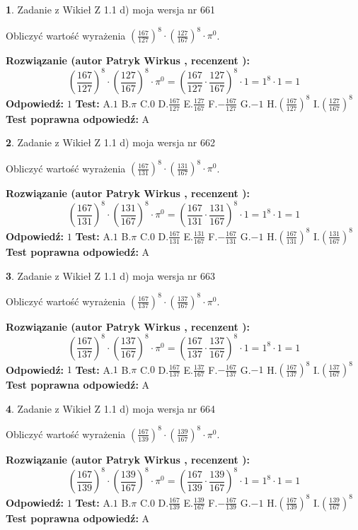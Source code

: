 \documentclass[12pt, a4paper]{article}
\theoremstyle{definition} %
\newtheorem{zad}{}
\newcommand{\zadStart}[1]{\begin{zad}#1\newline}
\newcommand{\zadStop}{\end{zad}}
\newcommand{\rozwStart}[2]{\noindent \textbf{Rozwiązanie (autor #1 , recenzent #2): }\newline}
\newcommand{\rozwStop}{\newline}
\newcommand{\odpStart}{\noindent \textbf{Odpowiedź:}\newline}
\newcommand{\odpStop}{\newline}
\newcommand{\testStart}{\noindent \textbf{Test:}\newline}
\newcommand{\testStop}{\newline}
\newcommand{\kluczStart}{\noindent \textbf{Test poprawna odpowiedź:}\newline}
\newcommand{\kluczStop}{\newline}
\begin{document}
\zadStart{Zadanie z Wikieł Z 1.1 d) moja wersja nr 661}

Obliczyć wartość wyrażenia $(\frac{167}{127})^{8} \cdot (\frac{127}{167})^{8} \cdot \pi^{0}$.
\zadStop
\rozwStart{Patryk Wirkus}{}
$$(\frac{167}{127})^{8} \cdot (\frac{127}{167})^{8} \cdot \pi^{0} = (\frac{167}{127} \cdot \frac{127}{167})^{8} \cdot 1 = 1^{8} \cdot 1 = 1$$
\rozwStop
\odpStart
$1$
\odpStop
\testStart
A.$1$ B.$\pi$ C.$0$ D.$\frac{167}{127}$ E.$\frac{127}{167}$
F.$-\frac{167}{127}$ G.$-1$
H.$(\frac{167}{127})^{8}$
I.$(\frac{127}{167})^{8}$
\testStop
\kluczStart
A
\kluczStop



\zadStart{Zadanie z Wikieł Z 1.1 d) moja wersja nr 662}

Obliczyć wartość wyrażenia $(\frac{167}{131})^{8} \cdot (\frac{131}{167})^{8} \cdot \pi^{0}$.
\zadStop
\rozwStart{Patryk Wirkus}{}
$$(\frac{167}{131})^{8} \cdot (\frac{131}{167})^{8} \cdot \pi^{0} = (\frac{167}{131} \cdot \frac{131}{167})^{8} \cdot 1 = 1^{8} \cdot 1 = 1$$
\rozwStop
\odpStart
$1$
\odpStop
\testStart
A.$1$ B.$\pi$ C.$0$ D.$\frac{167}{131}$ E.$\frac{131}{167}$
F.$-\frac{167}{131}$ G.$-1$
H.$(\frac{167}{131})^{8}$
I.$(\frac{131}{167})^{8}$
\testStop
\kluczStart
A
\kluczStop



\zadStart{Zadanie z Wikieł Z 1.1 d) moja wersja nr 663}

Obliczyć wartość wyrażenia $(\frac{167}{137})^{8} \cdot (\frac{137}{167})^{8} \cdot \pi^{0}$.
\zadStop
\rozwStart{Patryk Wirkus}{}
$$(\frac{167}{137})^{8} \cdot (\frac{137}{167})^{8} \cdot \pi^{0} = (\frac{167}{137} \cdot \frac{137}{167})^{8} \cdot 1 = 1^{8} \cdot 1 = 1$$
\rozwStop
\odpStart
$1$
\odpStop
\testStart
A.$1$ B.$\pi$ C.$0$ D.$\frac{167}{137}$ E.$\frac{137}{167}$
F.$-\frac{167}{137}$ G.$-1$
H.$(\frac{167}{137})^{8}$
I.$(\frac{137}{167})^{8}$
\testStop
\kluczStart
A
\kluczStop



\zadStart{Zadanie z Wikieł Z 1.1 d) moja wersja nr 664}

Obliczyć wartość wyrażenia $(\frac{167}{139})^{8} \cdot (\frac{139}{167})^{8} \cdot \pi^{0}$.
\zadStop
\rozwStart{Patryk Wirkus}{}
$$(\frac{167}{139})^{8} \cdot (\frac{139}{167})^{8} \cdot \pi^{0} = (\frac{167}{139} \cdot \frac{139}{167})^{8} \cdot 1 = 1^{8} \cdot 1 = 1$$
\rozwStop
\odpStart
$1$
\odpStop
\testStart
A.$1$ B.$\pi$ C.$0$ D.$\frac{167}{139}$ E.$\frac{139}{167}$
F.$-\frac{167}{139}$ G.$-1$
H.$(\frac{167}{139})^{8}$
I.$(\frac{139}{167})^{8}$
\testStop
\kluczStart
A
\kluczStop
\end{document}
